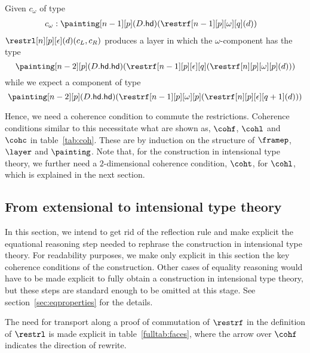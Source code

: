\documentclass{msc}
\newcommand{\hd}{\ensuremath{\mathsf{hd}}}
\begin{document}
Given $c_\omega$ of type
\begin{align*}
  c_\omega & : \painting[n-1][p](D.\hd)(\restrf[n-1][p][\omega][q](d))
\end{align*}
$\restrl[n][p][\epsilon](d)(c_L, c_R)$ produces a layer in which the $\omega$-component has the type
\begin{equation*}
  \painting[n-2][p](D.\hd.\hd)(\restrf[n-1][p][\epsilon][q](\restrf[n][p][\omega][p](d)))
\end{equation*}
while we expect a component of type
\begin{equation*}
  \painting[n-2][p](D.\hd.\hd)(\restrf[n-1][p][\omega][p](\restrf[n][p][\epsilon][q+1](d)))
\end{equation*}

Hence, we need a coherence condition to commute the restrictions. Coherence conditions similar to this necessitate what are shown as, $\cohf$, $\cohl$ and $\cohc$ in table~\ref{tab:coh}. These are by induction on the structure of $\framep$, $\layer$ and $\painting$. Note that, for the construction in intensional type theory, we further need a $2$-dimensional coherence condition, $\coht$, for $\cohl$, which is explained in the next section.

\subsection{From extensional to intensional type theory\label{sec:itt}}
In this section, we intend to get rid of the reflection rule and make explicit the equational reasoning step needed to rephrase the construction in intensional type theory. For readability purposes, we make only explicit in this section the key coherence conditions of the construction. Other cases of equality reasoning would have to be made explicit to fully obtain a construction in intensional type theory, but these steps are standard enough to be omitted at this stage. See section~\ref{sec:eqproperties} for the details.

The need for transport along a proof of commutation of $\restrf$ in the definition of $\restrl$ is made explicit in table~\ref{fulltab:faces}, where the arrow over $\cohf$ indicates the direction of rewrite. \\
\end{document}
